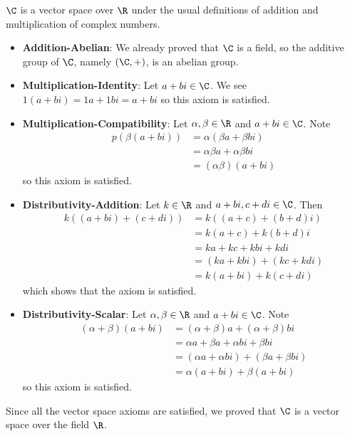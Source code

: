 \begin{example}
    $\C$ is a vector space over $\R$ under the usual definitions of addition and multiplication of complex numbers.
    \begin{itemize}
        \item \textbf{Addition-Abelian}: We already proved that $\C$ is a field, so the additive group of $\C$, namely $(\C, +)$, is an abelian group.
        
        \item \textbf{Multiplication-Identity}: Let $a + bi \in \C$. We see $1(a+bi) = 1a + 1bi = a + bi$ so this axiom is satisfied.

        \item \textbf{Multiplication-Compatibility}: Let $\alpha, \beta \in \R$ and $a + bi \in \C$. Note
        \begin{align*}
            p(\beta(a+bi)) &= \alpha(\beta a + \beta bi)\\
            &= \alpha\beta a + \alpha\beta bi\\
            &= (\alpha\beta)(a+bi)
        \end{align*}
        so this axiom is satisfied.
        
        \item \textbf{Distributivity-Addition}: Let $k \in \R$ and $a + bi, c + di \in \C$. Then
        \begin{align*}
            k((a+bi) + (c+di)) &= k((a+c) + (b+d)i)\\
            &= k(a+c) + k(b+d)i\\
            &= ka + kc + kbi + kdi\\
            &= (ka + kbi) + (kc + kdi)\\
            &= k(a+bi) + k(c+di)
        \end{align*}
        which shows that the axiom is satisfied.
        
        \item \textbf{Distributivity-Scalar}: Let $\alpha, \beta \in \R$ and $a + bi \in \C$. Note
        \begin{align*}
            (\alpha+\beta)(a+bi) &= (\alpha+\beta)a + (\alpha+\beta)bi\\
            &= \alpha a + \beta a + \alpha bi + \beta bi\\
            &= (\alpha a + \alpha bi) + (\beta a + \beta bi)\\
            &= \alpha(a+bi) + \beta(a+bi)
        \end{align*}
        so this axiom is satisfied.
    \end{itemize}
    
    Since all the vector space axioms are satisfied, we proved that $\C$ is a vector space over the field $\R$.
\end{example}


